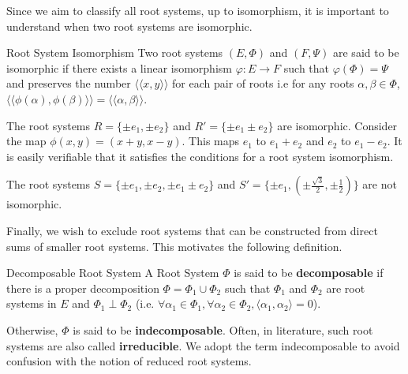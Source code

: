 Since we aim to classify all root systems, up to isomorphism, it is important to understand when two root systems are
isomorphic. \newline

\begin{nameddefinition}{Root System Isomorphism}
    Two root systems $(E, \Phi)$ and $(F,\Psi)$ are said to be isomorphic if there exists a linear isomorphism
    $\varphi: E \to F$ such that $\varphi(\Phi) = \Psi$
    and preserves the number $\langle \langle x, y \rangle \rangle$ for each pair of roots i.e 
    for any roots $\alpha, \beta \in \Phi$, $\langle \langle \phi(\alpha), \phi(\beta) \rangle \rangle = \langle \langle \alpha, \beta \rangle \rangle$.
\end{nameddefinition}

\begin{example}
    The root systems $R = \{ \pm e_1, \pm e_2 \} $ and $R' = \{ \pm e_1 \pm e_2 \}$ are isomorphic. 
    Consider the map $\phi(x, y) = (x + y, x-y)$. This maps $e_1$ to $e_1 + e_2$ and $e_2$ to $e_1 - e_2$.
    It is easily verifiable that it satisfies the conditions for a root system isomorphism.
\end{example}


\begin{example}
    The root systems
    $S = \{ \pm e_1, \pm e_2, \pm e_1 \pm e_2 \} $ and
    $S' = \{ \pm e_1, (\pm \frac{\sqrt{3}}{2}, \pm \frac{1}{2}) \}$ are not isomorphic.
\end{example}

Finally, we wish to exclude root systems that can be constructed from direct sums of smaller root systems.
This motivates the following definition. \newline

\begin{nameddefinition}{Decomposable Root System}
    A Root System $\Phi$ is said to be \textbf{decomposable} if there is a proper decomposition
    $\Phi = \Phi_1 \cup \Phi_2$ such that $\Phi_1$ and $\Phi_2$ are root systems in $E$ and $\Phi_1 \perp \Phi_2$ (i.e. 
    $\forall \alpha_1 \in \Phi_1 , \forall \alpha_2 \in \Phi_2,  \langle \alpha_1, \alpha_2 \rangle = 0$). \newline 

    Otherwise, $\Phi$ is said to be \textbf{indecomposable}. 
    Often, in literature, such root systems are also called \textbf{irreducible}.
    We adopt the term indecomposable to avoid confusion with the notion of reduced root systems.
\end{nameddefinition}

